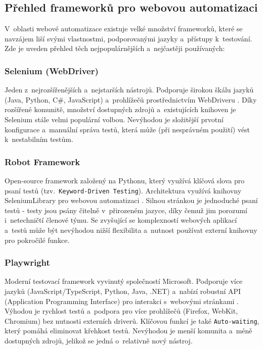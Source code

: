 \documentclass[czech, ing, kiv, he, iso690numb, viewonly]{fasthesis}
\begin{document}
\subsection{Přehled frameworků pro webovou automatizaci}
V~oblasti webové automatizace existuje velké množství frameworků, které se navzájem liší svými vlastnostmi, podporovanými jazyky a~přístupy k~testování.
Zde je uveden přehled těch nejpopulárnějších a~nejčastěji používaných:

\subsubsection*{Selenium (WebDriver)}
Jeden z~nejrozšířenějších a~nejstarších nástrojů. Podporuje širokou škálu jazyků (Java, Python, C\#, JavaScript) a~prohlížečů prostřednictvím WebDriveru \cite{selenium_docs}. Díky rozšířené 
komunitě, množství dostupných zdrojů a~existujících knihoven je Selenium stále velmi populární volbou. Nevýhodou je 
složitější prvotní konfigurace a~manuální správa testů, která může (při nesprávném použití) vést k~nestabilním testům.

\subsubsection*{Robot Framework}
Open-source framework založený na Pythonu, který využívá klíčová slova pro psaní testů (tzv.~\texttt{Keyword-Driven Testing}).
Architektura využívá knihovny SeleniumLibrary pro webovou automatizaci \cite{robot_framework}. Silnou stránkou je jednoduché psaní testů - 
testy jsou psány čitelně v~přirozeném jazyce, díky čemuž jim porozumí i~netechničtí členové týmu. Se zvyšující se komplexností 
webových aplikací a~testů může být nevýhodou nižší flexibilita a~nutnost používat externí knihovny pro pokročilé funkce.

\subsubsection*{Playwright}
Moderní testovací framework vyvinutý společností Microsoft. Podporuje více jazyků (JavaScript/TypeScript, Python, Java, .NET) a~nabízí robustní API (Application Programming Interface) pro interakci s~webovými stránkami \cite{playwright_docs}. Výhodou je rychlost testů a~podpora pro více prohlížečů (Firefox, WebKit, Chromium) bez 
nutnosti externích driverů. Klíčovou funkcí je také \texttt{Auto-waiting}, který pomáhá eliminovat křehkost testů. Nevýhodou je menší komunita a~méně dostupných zdrojů,
jelikož se jedná o~relativně nový nástroj.
\end{document}
